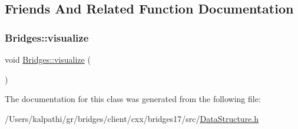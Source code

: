 \subsection{Friends And Related Function Documentation}
\mbox{\label{classbridges_1_1_data_structure_a0a9e3be9faab475909293766dcda4779}} 
\subsubsection{\texorpdfstring{Bridges\+::visualize}{Bridges::visualize}}
{\footnotesize\ttfamily void \mbox{\hyperlink{namespacebridges_1_1_bridges_a2806e395134614cdd6327400b53d28ad}{Bridges\+::visualize}} (\begin{DoxyParamCaption}{ }\end{DoxyParamCaption})\hspace{0.3cm}{\ttfamily [friend]}}



The documentation for this class was generated from the following file\+:\begin{DoxyCompactItemize}
\item 
/\+Users/kalpathi/gr/bridges/client/cxx/bridges17/src/\mbox{\hyperlink{_data_structure_8h}{Data\+Structure.\+h}}\end{DoxyCompactItemize}
